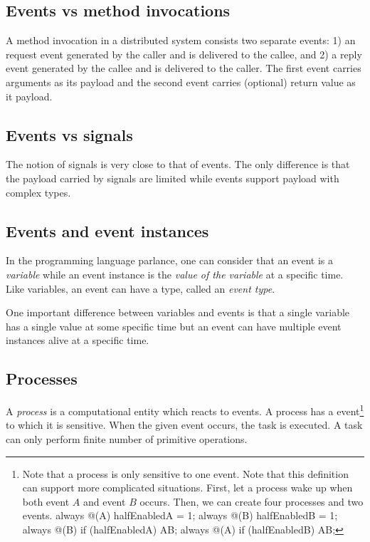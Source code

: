 \documentclass{pamsbook}
\begin{document}
\subsection{Events vs method invocations} 
A method invocation in a distributed system consists two separate events: 1)
an request event generated by the caller  and is delivered to the callee, and
2) a reply event generated by the callee and is delivered to the caller. 
The first event carries arguments as its payload and the second event carries
(optional) return value as it payload.

\subsection{Events vs signals}
The notion of signals is very close to that of events. The only difference is
that the payload carried by signals are limited while events support payload
with complex types. 

\subsection{Events and event instances}
In the programming language parlance, one can consider that an event is a {\em
  variable\/} while an event instance is the {\em value of the variable\/} at
a specific time. Like variables, an event can have a type, called an {\em
  event type\/}.  

One important difference between variables and events is
that a single variable has a single value at some specific time but an event
can have multiple event instances alive at a specific time. 

\subsection{Processes}
A {\em process\/} is a computational entity which reacts to events. A process
has a event\footnote{Note that a process is only sensitive to one event. Note
  that this definition can support more complicated situations. First, let a
  process wake up when both event $A$ and event $B$ occurs. Then, we can create
  four processes and two events. always @(A) halfEnabledA = 1; always @(B)
  halfEnabledB = 1; always @(B) if (halfEnabledA) AB; always @(A) if
  (halfEnabledB) AB;} to which it is sensitive. When the given event occurs,
the task is executed. A task can only perform finite number of
primitive operations.
\end{document}
